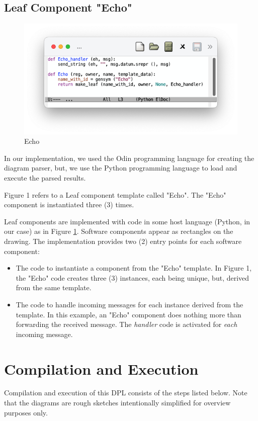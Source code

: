 \documentclass[10pt,anonymous,review]{acmart}
\begin{document}
\subsection{Leaf Component "Echo"}
\begin{figure}
    \includegraphics[trim=1cm 2cm 1cm 1cm, clip, scale=0.4]{./media/echo.png}
    \caption{Echo}
    \label{fig:echo}
\end{figure}
In our implementation, we used the Odin programming language for
creating the diagram parser, but, we use the Python programming
language to load and execute the parsed results.

Figure 1 refers to a Leaf component template called "Echo". The "Echo"
component is instantiated three (3) times. 

Leaf components are
implemented with code in some host language (Python, in our case) as in Figure \ref{fig:echo}. Software components
appear as rectangles on the drawing. The implementation provides two (2)
entry points for each software component:
\begin{itemize}
\item The code to instantiate a component from the "Echo" template. In Figure
1, the "Echo" code creates three (3) instances, each being unique, but,
derived from the same template.

\item The code to handle incoming messages for each instance derived from the
template. In this example, an "Echo" component does nothing more than
forwarding the received message. The \emph{handler} code is activated for
\emph{each} incoming message.
\end{itemize}

\section{Compilation and Execution}
Compilation and execution of this DPL consists of the steps listed below. Note that the diagrams are rough sketches intentionally simplified
for overview purposes only.
\end{document}
